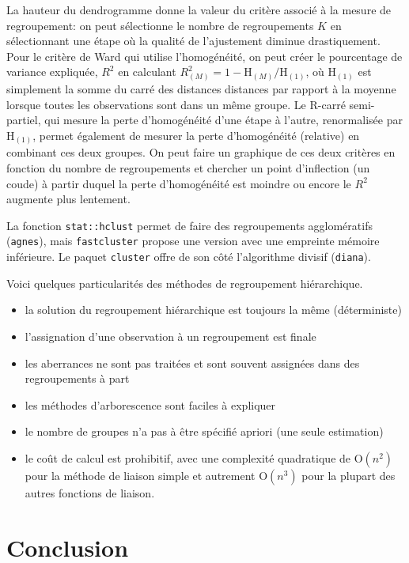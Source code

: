 \documentclass[
  11pt,
  letterpaper,
]{scrbook}
\providecommand{\tightlist}{%
  \setlength{\itemsep}{0pt}\setlength{\parskip}{0pt}}\usepackage{longtable,booktabs,array}
\theoremstyle{definition}
\theoremstyle{remark}
\begin{document}
La hauteur du dendrogramme donne la valeur du critère associé à la
mesure de regroupement: on peut sélectionne le nombre de regroupements
\(K\) en sélectionnant une étape où la qualité de l'ajustement diminue
drastiquement. Pour le critère de Ward qui utilise l'homogénéité, on
peut créer le pourcentage de variance expliquée, \(R^2\) en calculant
\(R^2_{(M)} = 1-\mathrm{H}_{(M)}/\mathrm{H}_{(1)}\), où
\(\mathrm{H}_{(1)}\) est simplement la somme du carré des distances
distances par rapport à la moyenne lorsque toutes les observations sont
dans un même groupe. Le R-carré semi-partiel, qui mesure la perte
d'homogénéité d'une étape à l'autre, renormalisée par
\(\mathrm{H}_{(1)}\), permet également de mesurer la perte d'homogénéité
(relative) en combinant ces deux groupes. On peut faire un graphique de
ces deux critères en fonction du nombre de regroupements et chercher un
point d'inflection (un coude) à partir duquel la perte d'homogénéité est
moindre ou encore le \(R^2\) augmente plus lentement.

La fonction \texttt{stat::hclust} permet de faire des regroupements
agglomératifs (\texttt{agnes}), mais \texttt{fastcluster} propose une
version avec une empreinte mémoire inférieure. Le paquet
\texttt{cluster} offre de son côté l'algorithme divisif
(\texttt{diana}).

Voici quelques particularités des méthodes de regroupement hiérarchique.

\begin{itemize}
\tightlist
\item
  la solution du regroupement hiérarchique est toujours la même
  (déterministe)
\item
  l'assignation d'une observation à un regroupement est finale
\item
  les aberrances ne sont pas traitées et sont souvent assignées dans des
  regroupements à part
\item
  les méthodes d'arborescence sont faciles à expliquer
\item
  le nombre de groupes n'a pas à être spécifié apriori (une seule
  estimation)
\item
  le coût de calcul est prohibitif, avec une complexité quadratique de
  \(\mathrm{O}(n^2)\) pour la méthode de liaison simple et autrement
  \(\mathrm{O}(n^3)\) pour la plupart des autres fonctions de liaison.
\end{itemize}

\section{Conclusion}\label{conclusion}
\end{document}

